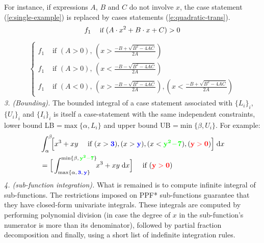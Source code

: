 \documentclass[letterpaper]{article}
\newcommand{\indicator}{\mathbb{I}}%
\newcommand{\case}[2]{#2 &\text{ if } #1}%
\newcommand{\singlecase}[2]{#2 \quad \text{ if } #1}
\newcommand{\dd}{\;\mathrm{d}} %
\begin{document}
\begin{enumerate}[leftmargin=2.6ex]
For instance, if expressions {\footnotesize$A$}, {\footnotesize$B$} and {\footnotesize$C$} do not involve $x$,
the case statement (\ref{e:single-example})
is replaced by cases statements (\ref{e:quadratic-trans}).
\begin{equation}\footnotesize
\label{e:single-example}
\singlecase{(A \cdot x^2 + B \cdot x + C)>0}{f_1}
\end{equation}
{\footnotesize
\begin{align}
\label{e:quadratic-trans}
\begin{cases}
  \case{(A>0), \, (x> \frac{-B + \sqrt{B^2 - 4 A C}}{2 A}) }{f_1} \\ 
  \case{(A>0), \, (x< \frac{-B - \sqrt{B^2 - 4 A C}}{2 A}) }{f_1} \\ 
  \case{(A<0), \, (x> \frac{-B - \sqrt{B^2 - 4 A C}}{2 A}),
                              (x< \frac{-B + \sqrt{B^2 - 4 A C}}{2 A})}{f_1}
 \end{cases}
\end{align}
}
\emph{3. (Bounding).} The bounded integral of a case statement 
associated with $\{L_i\}_i$, $\{U_i\}_i$ and $\{I_i\}_i$ 
is itself a case-statement with the same independent constraints,
 lower bound LB =$\max\{\alpha, L_i\}$ and 
 upper bound UB =$ \min\{\beta, U_i\}$.
For example:
{\footnotesize 
\begin{align*}
&\int_{\alpha}^{\beta}\!\! \Big[
\singlecase{(x>{\bf\color{blue}3}), (x>{\bf\color{blue}y}), 
(x<{\bf\color{green}y^2\!-\!7}),  ({\bf\color{red}y>0})}
{x^3 + xy} \Big] \dd x \\
%
&=\singlecase{({\bf\color{red}y>0})}
{\Big[ \int_{\max\{\alpha, \,{\bf {\color{blue}3}, \, {\color{blue}y}}\}}^{\min\{\beta, \, {\bf\color{green} y^2 - 7}\}} \!\! x^3 + xy \dd x \Big]} 
\end{align*}  
}
\emph{4. (sub-function integration).} %
What is remained is to compute infinite integral of sub-functions. 
The restrictions imposed on PPF* sub-functions 
guarantee that they have closed-form %
univariate integrals.
These integrals are computed by performing polynomial division 
(in case the degree of $x$ in the sub-function's numerator is more than its denominator),
followed by partial fraction decomposition and finally, using a short list of indefinite integration rules.



\end{enumerate}
\end{document}
